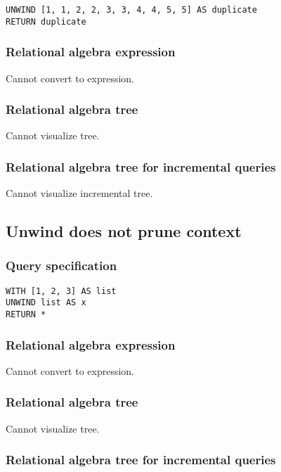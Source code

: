 \begin{lstlisting}
UNWIND [1, 1, 2, 2, 3, 3, 4, 4, 5, 5] AS duplicate
RETURN duplicate
\end{lstlisting}

\subsubsection*{Relational algebra expression}

Cannot convert to expression.

\subsubsection*{Relational algebra tree}

Cannot visualize tree.

\subsubsection*{Relational algebra tree for incremental queries}

Cannot visualize incremental tree.

\subsection{Unwind does not prune context}

\subsubsection*{Query specification}

\begin{lstlisting}
WITH [1, 2, 3] AS list
UNWIND list AS x
RETURN *
\end{lstlisting}

\subsubsection*{Relational algebra expression}

Cannot convert to expression.

\subsubsection*{Relational algebra tree}

Cannot visualize tree.

\subsubsection*{Relational algebra tree for incremental queries}

